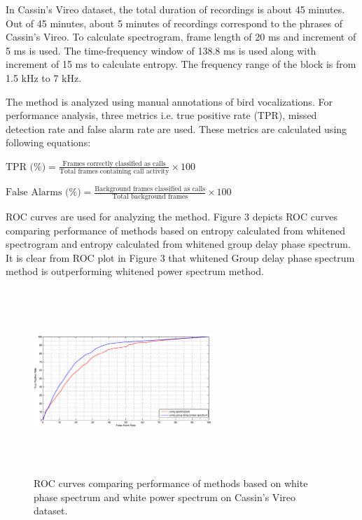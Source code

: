 \documentclass[a4paper]{article}
\begin{document}
In Cassin's Vireo dataset, the total duration of recordings is about 45 minutes. Out of 45 minutes, about 5 minutes of recordings correspond to the phrases of Cassin's Vireo. To calculate spectrogram, frame length of 20 ms and increment of  
5 ms is used. The time-frequency window of 138.8 ms is used along with increment of 15 ms to calculate entropy. The frequency range of the block is from 1.5 kHz to 7 kHz.  

The method is analyzed using manual annotations of bird vocalizations. For performance analysis, three metrics i.e. true positive rate (TPR), missed detection rate and false alarm rate are used. These metrics are calculated using following equations:\newline



    

$\text{TPR (\%)}=\frac{\text{Frames correctly classified as calls}} {\text{Total frames containing call activity}} \times 100$ \newline






$\text{False Alarms (\%)}=\frac{\text{Background  frames classified as calls}} {\text{Total background frames}} \times 100$ \newline



 ROC curves are used for analyzing the method. Figure 3 depicts ROC curves comparing performance of methods based on entropy calculated from whitened spectrogram and entropy calculated from whitened group delay phase spectrum. It is clear from ROC plot in Figure 3 that whitened Group delay phase spectrum method is outperforming whitened power spectrum method.

\begin{figure}[h]
\centering
\includegraphics[width=0.6\textwidth,height=7cm]{ROC_gr_delay_5_VS_spectrogram.eps}
\caption{ROC  curves  comparing  performance  of  methods based on white phase spectrum and white power spectrum on Cassin's Vireo dataset.}
\label{fig:ROCdata1}
\end{figure}
\end{document}
